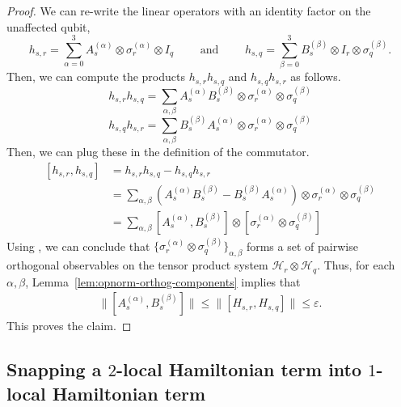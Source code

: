 \documentclass[a4paper,onecolumn,11pt]{quantumarticle}
\theoremstyle{plain}
\newcommand{\eps}{\varepsilon}
\begin{document}
\begin{proof}
We can re-write the linear operators with an identity factor on the unaffected qubit,
    \begin{equation}
        h_{s,r} = \sum\limits_{\alpha = 0}^{3} A_s^{(\alpha)} \otimes \sigma_r^{(\alpha)} \otimes I_{q}\quad\quad\text{ and } \quad\quad h_{s,q} = \sum\limits_{\beta = 0}^{3} B_s^{(\beta)} \otimes I_r \otimes \sigma_q^{(\beta)}.
    \end{equation}
Then, we can compute the products $h_{s,r} h_{s,q}$ and $h_{s,q} h_{s,r}$ as follows.
\begin{equation}
    h_{s,r} h_{s,q} = \sum\limits_{\alpha, \beta} A_s^{(\alpha)} B_s^{(\beta)} \otimes \sigma_r^{(\alpha)} \otimes \sigma_q^{(\beta)}
\end{equation}
\begin{equation}
    h_{s,q} h_{s,r} = \sum\limits_{\alpha, \beta}  B_s^{(\beta)} A_s^{(\alpha)} \otimes \sigma_r^{(\alpha)} \otimes \sigma_q^{(\beta)}
\end{equation}
Then, we can plug these in the definition of the commutator.
\begin{align*}
    \left[h_{s,r}, h_{s,q}\right] &= h_{s,r} h_{s,q} - h_{s,q} h_{s,r}\\
    &= \sum\limits_{\alpha, \beta} \left(A_s^{(\alpha)} B_s^{(\beta)} - B_s^{(\beta)} A_s^{(\alpha)}\right) \otimes \sigma_r^{(\alpha)} \otimes \sigma_q^{(\beta)}\\
    &= \sum\limits_{\alpha, \beta} \left[A_s^{(\alpha)}, B_s^{(\beta)} \right] \otimes \left[\sigma_r^{(\alpha)} \otimes \sigma_q^{(\beta)}\right]
\end{align*}
Using , we can conclude that $\{\sigma_r^{(\alpha)} \otimes \sigma_q^{(\beta)}\}_{\alpha,\beta}$ forms a set of pairwise orthogonal observables on the tensor product system $\mathcal{H}_r \otimes \mathcal{H}_q$. Thus, for each $\alpha, \beta$, Lemma~\ref{lem:opnorm-orthog-components} implies that 
\begin{align}
\|[A_s^{(\alpha)}, B_s^{(\beta)}]\| \leq \|[H_{s, r}, H_{s, q}]\| \leq \eps.
\end{align}
This proves the claim.
\end{proof}

\subsection{Snapping a $2$-local Hamiltonian term into $1$-local Hamiltonian term}
\end{document}
